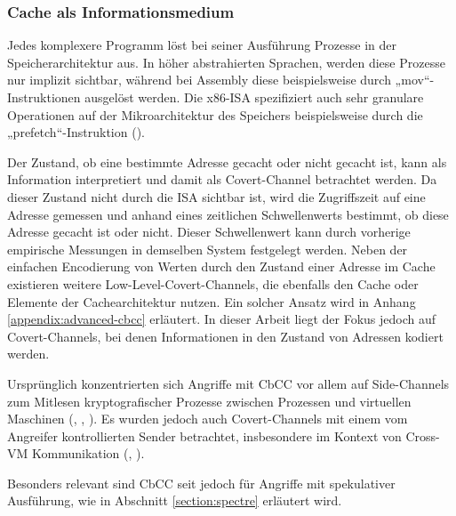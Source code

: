 \subsubsection{Cache als Informationsmedium}
Jedes komplexere Programm löst bei seiner Ausführung Prozesse in
der Speicherarchitektur aus. In höher abstrahierten Sprachen,
werden diese Prozesse nur implizit sichtbar, während bei Assembly
diese beispielsweise durch „mov“-Instruktionen ausgelöst
werden. Die x86-\ac{ISA} spezifiziert auch sehr granulare
Operationen auf der Mikroarchitektur des Speichers beispielsweise
durch die „prefetch“-Instruktion
(\cite{oracle_prefetch_2020}).

Der Zustand, ob eine bestimmte Adresse gecacht oder nicht gecacht
ist, kann als Information
interpretiert und damit als Covert-Channel betrachtet werden.
Da dieser Zustand nicht durch die \ac{ISA} sichtbar ist,
wird die Zugriffszeit auf eine Adresse gemessen und anhand eines
zeitlichen Schwellenwerts bestimmt, ob diese Adresse gecacht ist oder
nicht. Dieser Schwellenwert kann durch vorherige empirische
Messungen in demselben System festgelegt werden.
Neben der einfachen Encodierung von Werten durch den Zustand einer
Adresse im Cache existieren weitere Low-Level-Covert-Channels, die
ebenfalls den Cache oder Elemente der
Cachearchitektur nutzen. Ein solcher Ansatz wird in Anhang
\ref{appendix:advanced-cbcc} erläutert. In dieser Arbeit
liegt der Fokus jedoch auf Covert-Channels, bei denen
Informationen in den Zustand von Adressen kodiert werden.

Ursprünglich konzentrierten sich Angriffe mit \ac{CbCC} vor allem
auf Side-Channels zum Mitlesen kryptografischer Prozesse
zwischen Prozessen und virtuellen Maschinen
(\cite{bernstein_cache-timing_2005}, \cite{zhang_cross-vm_2012},
\cite{su_survey_2021}). Es wurden jedoch auch Covert-Channels mit
einem vom Angreifer kontrollierten Sender betrachtet, insbesondere
im Kontext von Cross-VM Kommunikation
(\cite{xu_exploration_2011}, \cite{maurice_hello_2017}).

Besonders relevant sind \ac{CbCC} seit
\cite{kocher_spectre_2019} jedoch für Angriffe mit
spekulativer Ausführung, wie in Abschnitt
\ref{section:spectre} erläutert wird.

